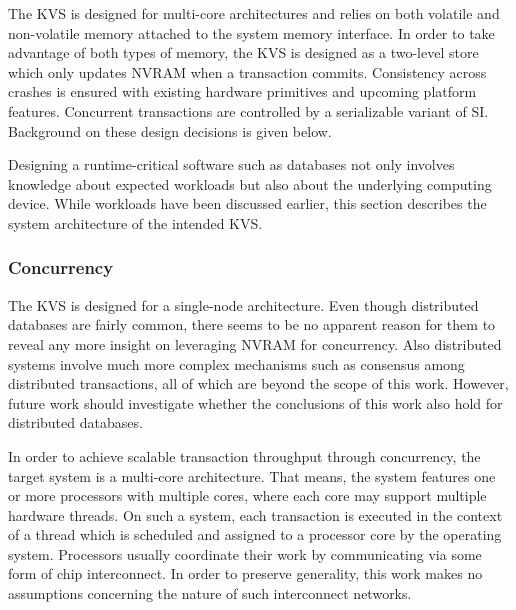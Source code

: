 The \ac{KVS} is designed for multi-core architectures and relies on both
volatile and non-volatile memory attached to the system memory interface. In
order to take advantage of both types of memory, the \ac{KVS} is designed as a
two-level store which only updates \ac{NVRAM} when a transaction commits.
Consistency across crashes is ensured with existing hardware primitives and
upcoming platform features. Concurrent transactions are controlled by a
serializable variant of \ac{SI}. Background on these design decisions is given
below.

Designing a runtime-critical software such as databases not only involves
knowledge about expected workloads but also about the underlying computing
device. While workloads have been discussed earlier, this section describes the
system architecture of the intended \ac{KVS}.

\subsubsection{Concurrency}

The \ac{KVS} is designed for a single-node architecture. Even though distributed
databases are fairly common, there seems to be no apparent reason for them to
reveal any more insight on leveraging \ac{NVRAM} for concurrency. Also
distributed systems involve much more complex mechanisms such as consensus among
distributed transactions, all of which are beyond the scope of this work.
However, future work should investigate whether the conclusions of this work
also hold for distributed databases.

In order to achieve scalable transaction throughput through concurrency, the
target system is a multi-core architecture. That means, the system features one
or more processors with multiple cores, where each core may support multiple
hardware threads. On such a system, each transaction is executed in the context
of a thread which is scheduled and assigned to a processor core by the operating
system. Processors usually coordinate their work by communicating via some form
of chip interconnect. In order to preserve generality, this work makes no
assumptions concerning the nature of such interconnect networks.

